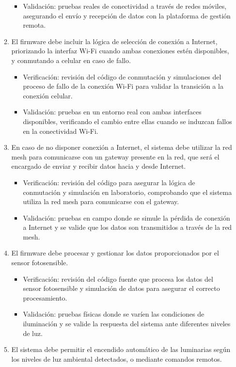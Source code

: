 \documentclass[
11pt, %
]{charter}
\begin{document}
\begin{enumerate}
\begin{enumerate}
\begin{itemize}
				\item Validación: pruebas reales de conectividad a través de redes móviles, asegurando el envío y recepción de datos con la plataforma de gestión remota.
				\end{itemize}
			\item El firmware debe incluir la lógica de selección de conexión a Internet, priorizando la interfaz Wi-Fi cuando ambas conexiones estén disponibles, y conmutando a celular en caso de fallo.
				\begin{itemize}
				\item Verificación: revisión del código de conmutación y simulaciones del proceso de fallo de la conexión Wi-Fi para validar la transición a la conexión celular.
				\item Validación: pruebas en un entorno real con ambas interfaces disponibles, verificando el cambio entre ellas cuando se induzcan fallos en la conectividad Wi-Fi.
				\end{itemize}
			\item En caso de no disponer conexión a Internet, el sistema debe utilizar la red mesh para comunicarse con un gateway presente en la red, que será el encargado de enviar y recibir datos hacia y desde Internet. 
				\begin{itemize}
				\item Verificación: revisión del código para asegurar la lógica de conmutación y simulación en laboratorio, comprobando que el sistema utiliza la red mesh para comunicarse con el gateway.
				\item Validación: pruebas en campo donde se simule la pérdida de conexión a Internet y se valide que los datos son transmitidos a través de la red mesh.
				\end{itemize}
			\item El firmware debe procesar y gestionar los datos proporcionados por el sensor fotosensible.
				\begin{itemize}
				\item Verificación: revisión del código fuente que procesa los datos del sensor fotosensible y simulación de datos para asegurar el correcto	procesamiento.
				\item Validación: pruebas físicas donde se varíen las condiciones de iluminación y se valide la respuesta del sistema ante diferentes niveles de luz.
				\end{itemize}
			\item El sistema debe permitir el encendido automático de las luminarias según los niveles de luz ambiental detectados, o mediante comandos remotos.

\end{enumerate}
\end{enumerate}
\end{document}
